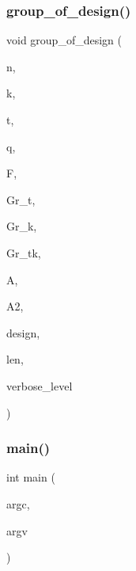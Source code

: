 \subsubsection{\texorpdfstring{group\+\_\+of\+\_\+design()}{group\_of\_design()}}
{\footnotesize\ttfamily void group\+\_\+of\+\_\+design (\begin{DoxyParamCaption}\item[{\mbox{\hyperlink{galois_8h_a09fddde158a3a20bd2dcadb609de11dc}{I\+NT}}}]{n,  }\item[{\mbox{\hyperlink{galois_8h_a09fddde158a3a20bd2dcadb609de11dc}{I\+NT}}}]{k,  }\item[{\mbox{\hyperlink{galois_8h_a09fddde158a3a20bd2dcadb609de11dc}{I\+NT}}}]{t,  }\item[{\mbox{\hyperlink{galois_8h_a09fddde158a3a20bd2dcadb609de11dc}{I\+NT}}}]{q,  }\item[{\mbox{\hyperlink{classfinite__field}{finite\+\_\+field}} $\ast$}]{F,  }\item[{\mbox{\hyperlink{classgrassmann}{grassmann}} $\ast$}]{Gr\+\_\+t,  }\item[{\mbox{\hyperlink{classgrassmann}{grassmann}} $\ast$}]{Gr\+\_\+k,  }\item[{\mbox{\hyperlink{classgrassmann}{grassmann}} $\ast$}]{Gr\+\_\+tk,  }\item[{\mbox{\hyperlink{classaction}{action}} $\ast$}]{A,  }\item[{\mbox{\hyperlink{classaction}{action}} $\ast$}]{A2,  }\item[{\mbox{\hyperlink{galois_8h_a09fddde158a3a20bd2dcadb609de11dc}{I\+NT}} $\ast$}]{design,  }\item[{\mbox{\hyperlink{galois_8h_a09fddde158a3a20bd2dcadb609de11dc}{I\+NT}}}]{len,  }\item[{\mbox{\hyperlink{galois_8h_a09fddde158a3a20bd2dcadb609de11dc}{I\+NT}}}]{verbose\+\_\+level }\end{DoxyParamCaption})}

\mbox{\label{analyze__q__designs_8_c_a217dbf8b442f20279ea00b898af96f52}} 
\subsubsection{\texorpdfstring{main()}{main()}}
{\footnotesize\ttfamily int main (\begin{DoxyParamCaption}\item[{int}]{argc,  }\item[{const char $\ast$$\ast$}]{argv }\end{DoxyParamCaption})}

